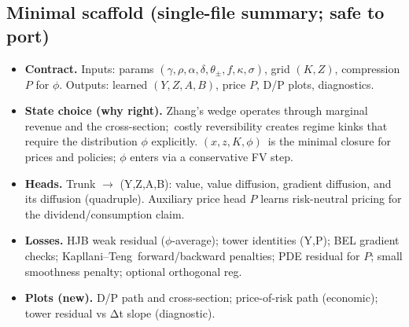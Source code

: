 ﻿\documentclass[11pt,letterpaper,oneside]{article}
\numberwithin{equation}{section}
\newcommand{\1}{\mathbf{1}}
\begin{document}
\subsection*{Minimal scaffold (single-file summary; safe to port)}
\begin{tcolorbox}[didacticstyle]
\begin{itemize}[leftmargin=1.15em,itemsep=0.25em]
  \item \textbf{Contract.} Inputs: params $(\gamma,\rho,\alpha,\delta,\theta_\pm, f,\kappa,\sigma)$, grid $(K,Z)$,
        compression $P$ for $\phi$. Outputs: learned $(Y,Z,A,B)$, price $P$, D/P plots, diagnostics.
  \item \textbf{State choice (why right).} Zhang's wedge operates through marginal revenue and the cross-section;\
    costly reversibility creates regime kinks that require the distribution $\phi$ explicitly. $(x,z,K,\phi)$\
        is the minimal closure for prices and policies; $\phi$ enters via a conservative FV step.
  \item \textbf{Heads.} Trunk $\to$ (Y,Z,A,B): value, value diffusion, gradient diffusion, and its diffusion (quadruple).
    Auxiliary price head $P$ learns risk-neutral pricing for the dividend/consumption claim.
  \item \textbf{Losses.} HJB weak residual ($\phi$-average); tower identities (Y,P); BEL gradient checks; Kapllani--Teng\
        forward/backward penalties; PDE residual for $P$; small smoothness penalty; optional orthogonal reg.
  \item \textbf{Plots (new).} D/P path and cross-section; price-of-risk path (economic); tower residual vs Δt slope (diagnostic).
\end{itemize}
\end{tcolorbox}
\end{document}
